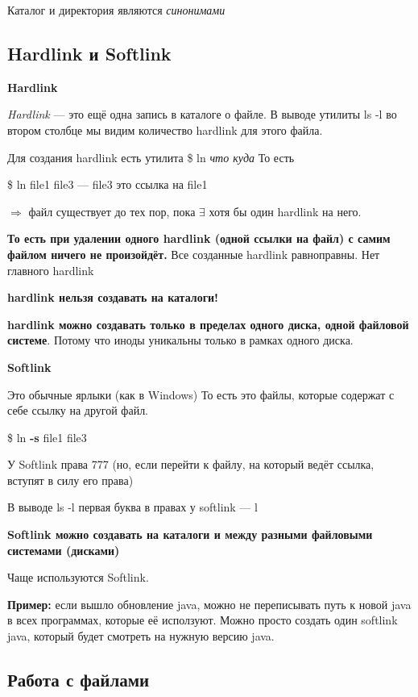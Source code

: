 \documentclass[oneside, final, 14pt]{extreport} %
\begin{document}
Каталог и директория являются \textit{синонимами}

\subsection{Hardlink и Softlink}

\textbf{Hardlink}

\textit{Hardlink} --- это ещё одна запись в каталоге о файле. В выводе утилиты ls -l во втором
столбце мы видим количество hardlink для этого файла.

Для создания hardlink есть утилита \$ ln \textit{что куда}
То есть 

\$ ln file1 file3 --- file3 это ссылка на file1

$ \Rightarrow $ файл существует до тех пор, пока $ \exists $ хотя бы один hardlink на него.

\textbf{То есть при удалении одного hardlink (одной ссылки на файл) с самим файлом ничего не произойдёт.}
Все созданные hardlink равноправны. Нет главного hardlink

\vspace*{\baselineskip}

\textbf{hardlink нельзя создавать на каталоги!}

\textbf{hardlink можно создавать только в пределах одного диска, одной файловой системе}. 
Потому что иноды уникальны только в рамках одного диска.

\vspace*{\baselineskip}

\textbf{Softlink}

Это обычные ярлыки (как в Windows)
То есть это файлы, которые содержат с себе ссылку на другой файл.

\$ ln \textbf{-s} file1 file3

У Softlink права 777 (но, если перейти к файлу, на который ведёт ссылка, вступят в силу его права)

В выводе ls -l первая буква в правах у softlink --- l

\textbf{Softlink можно создавать на каталоги и между разными файловыми системами (дисками)}

Чаще используются Softlink. 

\textbf{Пример:} если вышло обновление java, можно не переписывать путь к новой java в всех программах, которые 
её исползуют. Можно просто создать один softlink java, который будет смотреть на нужную версию java.


\subsection{Работа с файлами}
\end{document}

